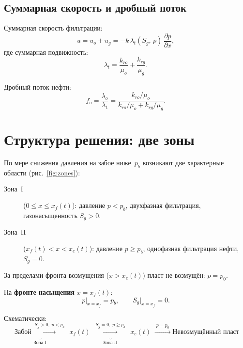 \documentclass[12pt,a4paper]{article}
\begin{document}
\subsection{Суммарная скорость и дробный поток}

Суммарная скорость фильтрации:
\begin{equation}\label{eq:total_velocity}
  u = u_o + u_g = -k\,\lambda_t(S_g,\,p)\,\frac{\partial p}{\partial x},
\end{equation}
где суммарная подвижность:
\begin{equation}\label{eq:total_mobility}
  \lambda_t = \frac{k_{ro}}{\mu_o} + \frac{k_{rg}}{\mu_g}.
\end{equation}

Дробный поток нефти:
\begin{equation}\label{eq:fractional_flow}
  f_o = \frac{\lambda_o}{\lambda_t}
  = \frac{k_{ro}/\mu_o}{k_{ro}/\mu_o + k_{rg}/\mu_g}.
\end{equation}

\section{Структура решения: две зоны}

По мере снижения давления на забое ниже~$p_b$ возникают две
характерные области (рис.~\ref{fig:zones}):

\begin{description}
  \item[Зона~I] ($0 \le x \le x_f(t)$): давление $p < p_b$, двухфазная
    фильтрация, газонасыщенность $S_g > 0$.
  \item[Зона~II] ($x_f(t) < x < x_e(t)$): давление $p \ge p_b$, однофазная
    фильтрация нефти, $S_g = 0$.
\end{description}

За пределами фронта возмущения ($x > x_e(t)$) пласт не возмущён: $p = p_0$.

На \textbf{фронте насыщения} $x = x_f(t)$:
\begin{equation}\label{eq:front_conditions}
  p\big|_{x=x_f} = p_b, \qquad S_g\big|_{x=x_f} = 0.
\end{equation}

Схематически:
\[
  \underbrace{\text{Забой}
  \;\xrightarrow{\;S_g > 0,\; p < p_b\;}}_{\text{Зона I}}
  \; x_f(t) \;
  \underbrace{\xrightarrow{\;S_g = 0,\; p \ge p_b\;}}_{\text{Зона II}}
  \; x_e(t) \;
  \xrightarrow{\;p = p_0\;}
  \text{Невозмущённый пласт}
\]
\end{document}
